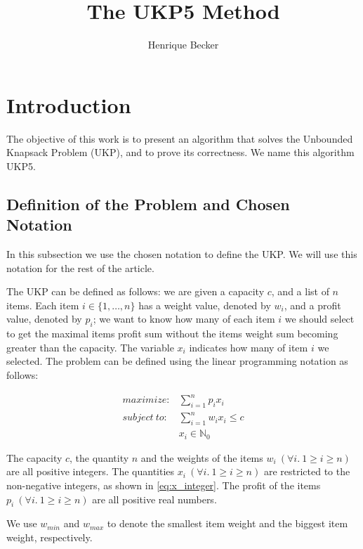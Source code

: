\documentclass[12pt]{article}
\title{The UKP5 Method}
\author{Henrique Becker\inst{1}}
\begin{document}
 

\maketitle

\section{Introduction}

The objective of this work is to present an algorithm that solves the Unbounded Knapsack Problem (UKP), and to prove its correctness. We name this algorithm UKP5.

\subsection{Definition of the Problem and Chosen Notation}

In this subsection we use the chosen notation to define the UKP. We will use this notation for the rest of the article.

The UKP can be defined as follows: we are given a capacity \(c\), and a list of \(n\) items. Each item \(i \in \{1, \ldots, n\}\) has a weight value, denoted by \(w_i\), and a profit value, denoted by \(p_i\); we want to know how many of each item \(i\) we should select to get the maximal items profit sum without the items weight sum becoming greater than the capacity. The variable \(x_i\) indicates how many of item \(i\) we selected. The problem can be defined using the linear programming notation as follows:

\begin{align}
  maximize: &\sum_{i=1}^n p_i x_i\label{eq:objfun}\\
subject~to: &\sum_{i=1}^n w_i x_i \leq c\label{eq:capcons}\\
            &x_i \in \mathbb{N}_0\label{eq:x_integer}
\end{align}

The capacity \(c\), the quantity \(n\) and the weights of the items \(w_i~(\forall i.~1 \geq i \geq n)\) are all positive integers. The quantities \(x_i~(\forall i.~1 \geq i \geq n)\) are restricted to the non-negative integers, as shown in \eqref{eq:x_integer}. The profit of the items \(p_i~(\forall i.~1 \geq i \geq n)\) are all positive real numbers.

We use \(w_{min}\) and \(w_{max}\) to denote the smallest item weight and the biggest item weight, respectively.
\end{document}
